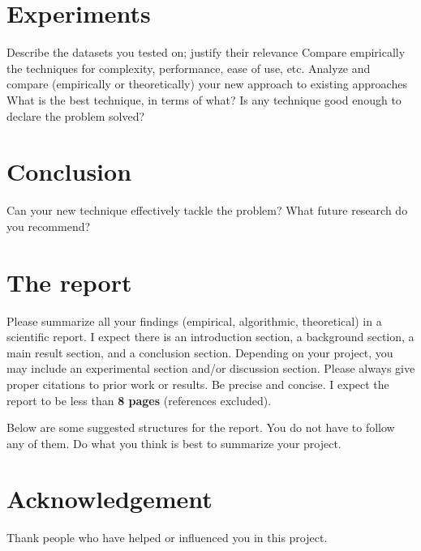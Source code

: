 \documentclass{article}
\begin{document}
\section{Experiments}
Describe the datasets you tested on; justify their relevance
Compare empirically the techniques for complexity, performance, ease of use, etc.
Analyze and compare (empirically or theoretically) your new approach to existing approaches
What is the best technique, in terms of what?
 Is any technique good enough to declare the problem solved?
\section{Conclusion}
Can your new technique effectively tackle the problem?
What future research do you recommend?
\newpage

\section*{The report}
Please summarize all your findings (empirical, algorithmic, theoretical) in a scientific report. I expect there is an introduction section, a background section, a main result section, and a conclusion section. Depending on your project, you may include an experimental section and/or discussion section. Please always give proper citations to prior work or results. Be precise and concise. I expect the report to be less than \textbf{8 pages} (references excluded).

Below are some suggested structures for the report. You do not have to follow any of them. Do what you think is best to summarize your project.

\newpage

\section*{Acknowledgement}
Thank people who have helped or influenced you in this project.

\nocite{*}



\end{document}
